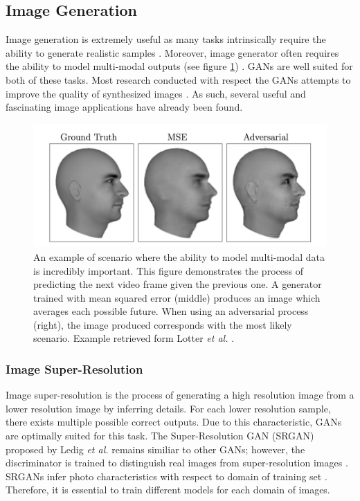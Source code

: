 \documentclass[11pt]{article}
\begin{document}
\subsection{Image Generation} \label{sec:img2img}
Image generation is extremely useful as many tasks intrinsically require the ability to generate realistic samples \citep{2017arXiv170100160G}. Moreover, image generator often requires the ability to model multi-modal outputs (see figure \ref{fig:multimodal}) \citep{2017arXiv170100160G}. GANs are well suited for both of these tasks. Most research conducted with respect the GANs attempts to improve the quality of synthesized images \citep{2017arXiv171007035C}. As such, several useful and fascinating image applications have already been found.

\begin{figure}
\centering
\includegraphics[scale=0.9]{multimodal}
\caption{An example of scenario where the ability to model multi-modal data is incredibly important. This figure demonstrates the process of predicting the next video frame given the previous one. A generator trained with mean squared error (middle) produces an image which averages each possible future. When using an adversarial process (right), the image produced corresponds with the most likely scenario. Example retrieved form Lotter \textit{et al.} \citep{2015arXiv151106380L}.}
\label{fig:multimodal}
\end{figure}

\subsubsection{Image Super-Resolution}
Image super-resolution is the process of generating a high resolution image from a lower resolution image by inferring details. For each lower resolution sample, there exists multiple possible correct outputs. Due to this characteristic, GANs are optimally suited for this task. The Super-Resolution GAN (SRGAN) proposed by Ledig \textit{et al.} remains similiar to other GANs; however, the discriminator is trained to distinguish real images from super-resolution images \citep{2016arXiv160904802L}. SRGANs infer photo characteristics with respect to domain of training set \citep{2017arXiv171007035C}. Therefore, it is essential to train different models for each domain of images.
\end{document}
